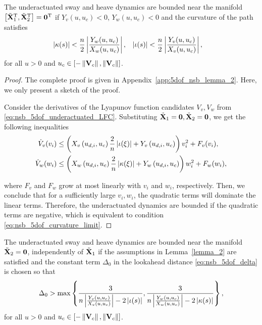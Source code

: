 \begin{lemma}
    \label{lemma_2}
    The underactuated sway and heave dynamics are bounded near the manifold $\left[\tilde{\mathbf{X}}_1^{\mathrm{T}}, \tilde{\mathbf{X}}_2^{\mathrm{T}}\right] = \mathbf{0}^{\mathrm{T}}$ if $Y_v(u, u_c) < 0$, $Y_w(u, u_c) < 0$ and the curvature of the path satisfies
    \begin{align}
        \left|\kappa(s)\right| &< \frac{n}{2}\left|\frac{Y_w(u, u_c)}{X_w(u, u_c)}\right|, &
        \left|\iota(s)\right| &< \frac{n}{2}\left|\frac{Y_v(u, u_c)}{X_v(u, u_c)}\right|, \label{eq:nsb_5dof_curvature_limit}
    \end{align}
    for all $u > 0$ and $u_c \in [-\left\|\mathbf{V}_c\right\|, \left\|\mathbf{V}_c\right\|]$.
\end{lemma}

\begin{proof}
    The complete proof is given in Appendix~\ref{app:5dof_nsb_lemma_2}.
    Here, we only present a sketch of the proof.

    Consider the derivatives of the Lyapunov function candidates $V_v, V_w$ from \eqref{eq:nsb_5dof_underactuated_LFC}.
    Substituting $\tilde{\mathbf{X}}_1 = \mathbf{0}, \tilde{\mathbf{X}}_2 = \mathbf{0}$, we get the following inequalities
    \begin{align} 
            \dot{V}_v(v_i) &\leq \left(X_v\left(u_{d,i}, u_c\right)\frac{2}{n}\left|\iota(\xi)\right| + Y_v\left(u_{d,i}, u_c\right)\right)v_i^2 + F_v(v_i), \\
            \dot{V}_w(w_i) &\leq \left(X_w\left(u_{d,i}, u_c\right)\frac{2}{n}\left|\kappa(\xi)\right| + Y_w\left(u_{d,i}, u_c\right)\right)w_i^2 + F_w(w_i),
    \end{align}

    \noindent where $F_v$ and $F_w$ grow at most linearly with $v_i$ and $w_i$, respectively.
    Then, we conclude that for a sufficiently large $v_i, w_i$, the quadratic terms will dominate the linear terms.
    Therefore, the underactuated dynamics are bounded if the quadratic terms are negative, which is equivalent to condition \eqref{eq:nsb_5dof_curvature_limit}.
\end{proof}

\begin{lemma}
    \label{lemma_3}
    The underactuated sway and heave dynamics are bounded near the manifold $\tilde{\mathbf{X}}_2 = \mathbf{0}$, independently of $\tilde{\mathbf{X}}_1$ if the assumptions in Lemma~\ref{lemma_2} are satisfied and the constant term $\Delta_0$ in the lookahead distance \eqref{eq:nsb_5dof_delta} is chosen so that
    \begin{equation}
        \Delta_0 > \max\left\{\frac{3}{n\left|\frac{Y_v\left(u, u_c\right)}{X_v\left(u, u_c\right)}\right| - 2\left|\iota(s)\right|}, \frac{3}{n\left|\frac{Y_w\left(u, u_c\right)}{X_w\left(u, u_c\right)}\right| - 2\left|\kappa(s)\right|}\right\},
        \label{eq:nsb_5dof_lookahead_limit}
    \end{equation}
    for all $u > 0$ and $u_c \in [-\left\|\mathbf{V}_c\right\|, \left\|\mathbf{V}_c\right\|]$.
\end{lemma}

